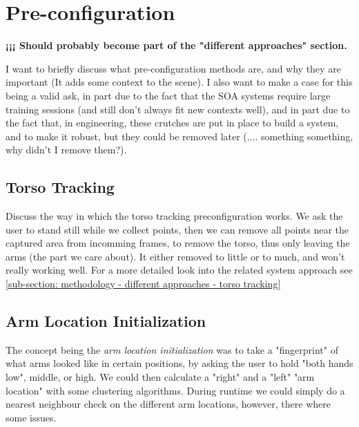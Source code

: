 \section{Pre-configuration}

\textbf{¡¡¡ Should probably become part of the "different approaches" section.}

\label{section: methodology - pre configuration}
I want to briefly discuss what pre-configuration methods are, and why they are important (It adds some context to the scene).
I also want to make a case for this being a valid ask, in part due to the fact that the SOA systems require large training sessions (and still don't always fit new contexts well), and in part due to the fact that, in engineering, these crutches are put in place to build a system, and to make it robust, but they could be removed later (.... something something, why didn't I remove them?).

\subsection{Torso Tracking}
\label{sub-section: methodology - pre configuration - torso tracking}
Discuss the way in which the torso tracking preconfiguration works.
We ask the user to stand still while we collect points, then we can remove all points near the captured area from incomming frames, to remove the torso, thus only leaving the arms (the part we care about).
It either removed to little or to much, and won't really working well.
For a more detailed look into the related system approach see \cref{sub-section: methodology - different approaches - torso tracking}


\subsection{Arm Location Initialization}
\label{sub-section: methodology - pre config - arm location initialization}
The concept being the \textit{arm location initialization} was to take a "fingerprint" of what arms looked like in certain positions, by asking the user to hold "both hands low", middle, or high.
We could then calculate a "right" and a "left" "arm location" with some clustering algorithms.
During runtime we could simply do a nearest neighbour check on the different arm locations, however, there where some issues.

